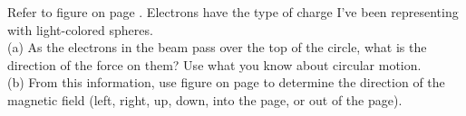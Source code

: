 Refer to figure  on page  \pageref{fig:circularorbit}. Electrons have the
type of charge I've been representing with light-colored spheres.\\
(a) As the electrons in the beam pass over the top of the circle,
what is the direction of the force on them? Use what you know about circular motion.\\
(b) From this information, use figure 
on page \pageref{fig:righthandrule} to determine the direction of the magnetic field
(left, right, up, down, into the page, or out of the page).
